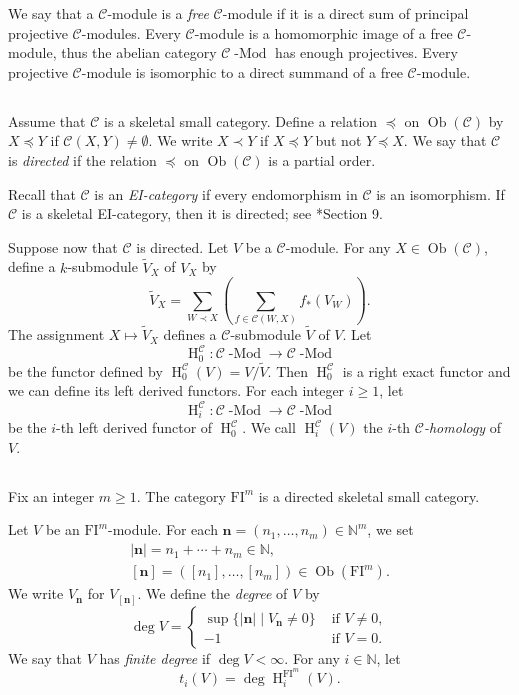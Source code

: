 \documentclass{amsart}
\numberwithin{equation}{section}
\DeclareMathOperator{\Mod}{-Mod}
\DeclareMathOperator{\HH}{H}
\DeclareMathOperator{\Ob}{Ob}
\newcommand{\C}{{\mathscr{C}}}
\newcommand{\N}{{\mathbb{N}}}
\newcommand{\FI}{{\mathrm{FI}}}
\begin{document}
We say that a $\C$-module is a \emph{free} $\C$-module if it is a direct sum of principal projective $\C$-modules. Every $\C$-module is a homomorphic image of a free $\C$-module, thus the abelian category $\C\Mod$ has enough projectives. Every projective $\C$-module is isomorphic to a direct summand of a free $\C$-module.

\subsection{}
Assume that $\C$ is a skeletal small category. Define a relation $\preceq$ on $\Ob(\C)$ by $X\preceq Y$ if $\C(X,Y)\neq \emptyset$. We write $X\prec Y$ if $X\preceq Y$ but not $Y\preceq X$. We say that $\C$ is \emph{directed} if the relation $\preceq$ on $\Ob(\C)$ is a partial order.

\begin{example}
Recall that $\C$ is an \emph{EI-category} if every endomorphism in $\C$ is an isomorphism. If $\C$ is a skeletal EI-category, then it is directed; see \cite{luck}*{Section 9}. 
\end{example}

Suppose now that $\C$ is directed. Let $V$ be a $\C$-module. 
For any $X\in\Ob(\C)$, define a $k$-submodule $\widetilde{V}_X$ of $V_X$ by
\[ \widetilde{V}_X =  \sum_{W\prec X} \left( \sum_{f\in \C(W,X)} f_*(V_W) \right). \]
The assignment $X\mapsto \widetilde{V}_X$ defines a $\C$-submodule $\widetilde{V}$ of $V$. Let 
\[ \HH^\C_0 : \C\Mod \to \C\Mod \] 
be the functor defined by $\HH^\C_0 (V) = V/\widetilde{V}$. Then $\HH^\C_0$ is a right exact functor and we can define its left derived functors. For each integer $i\geqslant 1$, let 
\[ \HH^\C_i : \C\Mod\to\C\Mod \] 
be the $i$-th left derived functor of $\HH^\C_0$. We call $\HH^\C_i(V)$ the $i$-th \emph{$\C$-homology} of $V$. 

\subsection{}
Fix an integer $m\geqslant 1$. The category $\FI^m$ is a directed skeletal small category. 

Let $V$ be an $\FI^m$-module. For each $\mathbf{n}=(n_1, \ldots, n_m)\in \N^m$, we set 
\begin{gather*} 
   |\mathbf{n}| = n_1+\cdots+n_m \in \N, \\
   [\mathbf{n}] = ([n_1], \ldots, [n_m]) \in \Ob(\FI^m).
\end{gather*}
We write $V_\mathbf{n}$ for $V_{[\mathbf{n}]}$. We define the \emph{degree} of $V$ by 
\[ \deg V = \begin{cases} 
               \sup \{ |\mathbf{n}| \mid V_\mathbf{n} \neq 0 \} & \mbox{ if } V\neq 0,\\
               -1 & \mbox{ if } V=0.
            \end{cases} \]
We say that $V$ has \emph{finite degree} if $\deg V < \infty$. For any $i\in \N$, let 
\[ t_i(V) = \deg \HH^{\FI^m}_i(V). \] 
\end{document}
